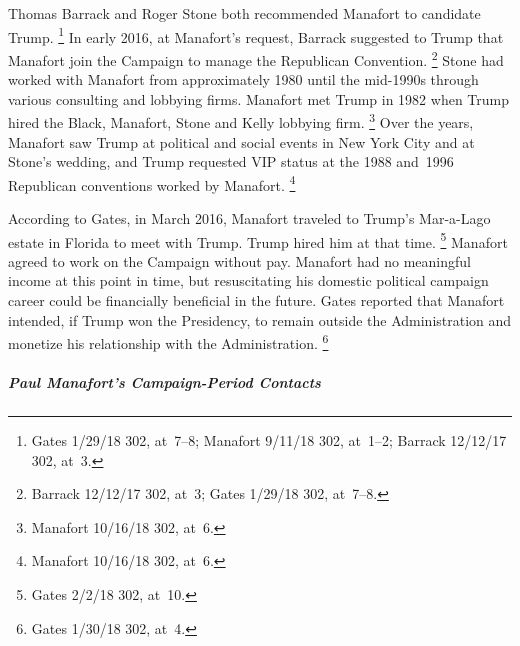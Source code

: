 Thomas Barrack and Roger Stone both recommended Manafort to candidate Trump.%
\footnote{Gates 1/29/18 302, at~7--8;
Manafort 9/11/18 302, at~1--2;
Barrack 12/12/17 302, at~3.}
In early 2016, at Manafort's request, Barrack suggested to Trump that Manafort join the Campaign to manage the Republican Convention.%
\footnote{Barrack 12/12/17 302, at~3;
Gates 1/29/18 302, at~7--8.}
Stone had worked with Manafort from approximately 1980 until the mid-1990s through various consulting and lobbying firms.
Manafort met Trump in 1982 when Trump hired the Black, Manafort, Stone and Kelly lobbying firm.%
\footnote{Manafort 10/16/18 302, at~6.}
Over the years, Manafort saw Trump at political and social events in New York City and at Stone's wedding, and Trump requested VIP status at the 1988 and~1996 Republican conventions worked by Manafort.%
\footnote{Manafort 10/16/18 302, at~6.}

According to Gates, in March 2016, Manafort traveled to Trump's Mar-a-Lago estate in Florida to meet with Trump.
Trump hired him at that time.%
\footnote{Gates 2/2/18 302, at~10.}
Manafort agreed to work on the Campaign without pay.
Manafort had no meaningful income at this point in time, but resuscitating his domestic political campaign career could be financially beneficial in the future.
Gates reported that Manafort intended, if Trump won the Presidency, to remain outside the Administration and monetize his relationship with the Administration.%
\footnote{Gates 1/30/18 302, at~4.}

\subparagraph{Paul Manafort's Campaign-Period Contacts}

